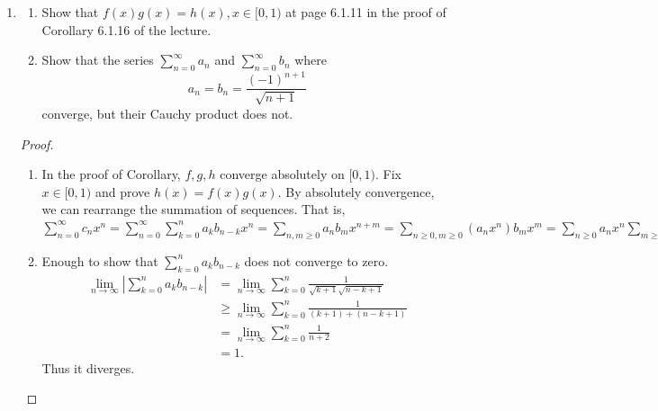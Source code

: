 \documentclass{article}
\begin{document}
\begin{enumerate}[font = \Large\bfseries\itshape\space, leftmargin = 3mm, labelsep = 3mm]
\begin{proof}
\begin{enumerate}[label = (\roman*)]
\end{enumerate}
\end{proof}

\item
\begin{enumerate}[label=(\roman*)]
\item
Show that $f(x)g(x) = h(x), x \in [0,1)$ at page 6.1.11 in the proof of Corollary 6.1.16 of the lecture.

\item
Show that the series $\sum_{n=0}^\infty a_n$ and $\sum_{n=0}^\infty b_n$ where
$$a_n = b_n = \frac{(-1)^{n+1}}{\sqrt{n+1}}$$
converge, but their Cauchy product does not.
\end{enumerate}

\begin{proof}
\begin{enumerate}[wide, label=(\roman*)]
\item In the proof of Corollary, $f, g, h$ converge absolutely on $[0,1)$.
Fix $x \in [0,1)$ and prove $h(x) = f(x)g(x)$.
By absolutely convergence, we can rearrange the summation of sequences.
That is,
$
\sum_{n=0}^\infty c_nx^n
= \sum_{n=0}^\infty \sum_{k=0}^n a_k b_{n-k} x^n
= \sum_{n,m \geq 0} a_nb_m x^{n+m}
= \sum_{n\geq 0, m \geq 0} (a_nx^n) b_mx^m
= \sum_{n\geq0}a_nx^n \sum_{m\geq 0} b_mx^m
= f(x)g(x).
$

\item
Enough to show that $\sum_{k=0}^n a_kb_{n-k}$ does not converge to zero.
$$
\begin{aligned}
\lim_{n\rightarrow \infty} |\sum_{k=0}^n a_kb_{n-k}|
&= \lim_{n\rightarrow \infty} \sum_{k=0}^n \frac{1}{\sqrt{k+1}\sqrt{n-k+1}}\\
&\geq \lim_{n\rightarrow\infty} \sum_{k=0}^n \frac{1}{(k+1) + (n-k+1)}\\
&= \lim_{n\rightarrow \infty} \sum_{k=0}^n \frac{1}{n+2}\\
&=1.
\end{aligned}
$$
Thus it diverges.

\end{enumerate}
\end{proof}

\end{enumerate}
\end{document}
